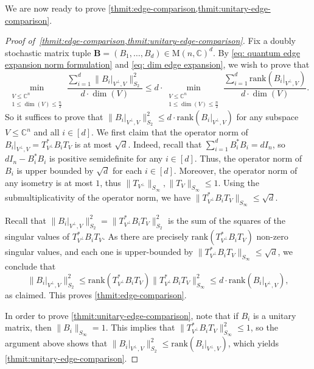\documentclass{toc}
\theoremstyle{plain}
\numberwithin{equation}{section}
\theoremstyle{definition}
\newcommand{\bC}{\mathbb{C}}
\newcommand{\rk}{\mathrm{rank}}
\newcommand{\norm}[1]{\lVert#1\rVert}
\newcommand{\M}{\mathrm{M}}
\newcommand{\tuple}[1]{\mathbf{#1}}
\newcommand{\vB}{\tuple{B}}
\begin{document}
We are now ready to prove \cref{thmit:edge-comparison,thmit:unitary-edge-comparison}.
\begin{proof}[Proof of~\cref{thmit:edge-comparison,thmit:unitary-edge-comparison}]
    Fix a doubly stochastic matrix tuple $\vB = (B_1,\dots,B_d) \in \M(n,\bC)^d$. By \eqref{eq: quantum edge expansion norm formulation} and \eqref{eq: dim edge expansion}, we wish to prove that
    \[
        \min_{\substack{V \leq \bC^n\\1\leq\dim(V)\leq\frac{n}{2}}}\frac{\sum_{i=1}^d\norm{B_i|_{V^\perp,V}}_{S_2}^2}{d\cdot\dim(V)} \leq
        d \cdot 
        \min_{\substack{V \leq \bC^n\\
        1\leq\dim(V)\leq \frac n2}}\frac{\sum_{i=1}^d\rk(B_i|_{V^\perp, V})}{d\cdot\dim(V)}.
    \]
    So it suffices to prove that
    $\norm{B_i|_{V^\perp, V}}_{S_2}^2\leq d\cdot \rk(B_i|_{V^\perp, V})$ for any subspace $V\leq\bC^n$ and all $i\in[d]$. We first claim that the operator norm of $B_i|_{V^\perp, V}=T_{V^\perp}^*B_iT_V$ is at most $\sqrt d$. Indeed, recall that $\sum_{i=1}^d B_i^*B_i=dI_n$, so $dI_n-B_i^*B_i$ is positive semidefinite for any $i\in[d]$. Thus, the operator norm of $B_i$ is upper bounded by $\sqrt d$ for each $i\in[d]$. Moreover, the operator norm of any isometry is at most $1$, thus $\norm{T_{V^\perp}}_{S_\infty},\norm{T_V}_{S_\infty}\leq 1$. Using the submultiplicativity of the operator norm, we have  $\norm{T_{V^\perp}^*B_iT_V}_{S_\infty}\leq \sqrt d$. 

    Recall that $ \norm{B_i|_{V^{\perp},V}}_{S_2}^2 = \norm{T_{V^\perp}^*B_i T_V}_{S_2}^2$ is the sum of the squares of the singular values of $T_{V^\perp}^*B_i T_V$. As there are precisely $\rk(T_{V^\perp}^*B_i T_V)$ non-zero singular values, and each one is upper-bounded by $\norm{T_{V^\perp}^*B_iT_V}_{S_\infty}\leq \sqrt d$, we conclude that 
  \[
  \norm{B_i|_{V^\perp, V}}_{S_2}^2\leq \rk(T_{V^\perp}^*B_iT_V)\norm{T_{V^\perp}^*B_iT_V}_{S_\infty}^2\leq d\cdot \rk(B_i|_{V^\perp, V}),
  \]
  as claimed. This proves \cref{thmit:edge-comparison}.

    In order to prove \cref{thmit:unitary-edge-comparison}, note that 
    if $B_i$ is a unitary matrix, then $\norm{B_i}_{S_\infty}=1$. This implies that $\norm{T_{V^\perp}^* B_i T_V}_{S_\infty}^2 \leq 1$, so the argument above shows that $\norm{B_i|_{V^\perp, V}}_{S_2}^2\leq \rk(B_i|_{V^\perp, V})$, which yields \cref{thmit:unitary-edge-comparison}.
\end{proof}

%
\end{document}

